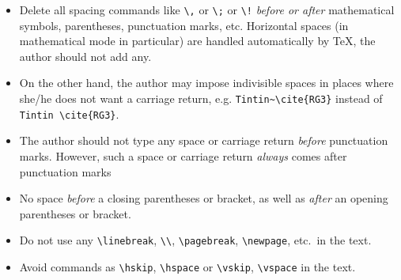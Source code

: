\documentclass[11pt,english]{smfart}
\begin{document}

\begin{itemize}
\item
Delete all spacing commands like \verb|\,| or \verb|\;| or \verb|\!|
{\em before or after} mathematical symbols, parentheses,
punctuation marks, etc. Horizontal spaces (in mathematical mode in particular) are handled automatically by \TeX, the author should not add any.
\item
On the other hand, the author may impose indivisible spaces in places where she/he does not want a carriage return, e.g.
\verb|Tintin~\cite{RG3}| instead of \verb|Tintin \cite{RG3}|.

\item
The author should not type any space or carriage return \emph{before}
punctuation marks. However, such a space or carriage return \emph{always} comes after punctuation marks

\item
No space \emph{before} a closing parentheses or bracket,
as well as \emph{after} an opening parentheses or bracket.

\item
Do not use any \verb|\linebreak|, \verb|\\|, \verb|\pagebreak|, \verb|\newpage|, etc.\ in the text.

\item
Avoid commands as \verb|\hskip|, \verb|\hspace|
or \verb|\vskip|, \verb|\vspace| in the text.
\end{itemize}

\end{document}

